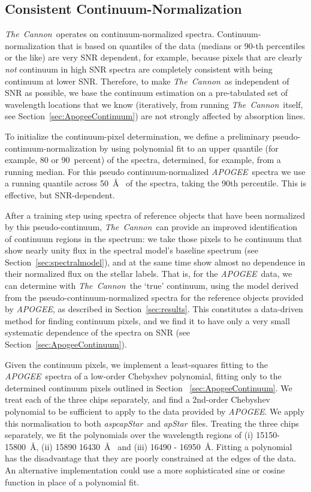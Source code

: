 \documentclass[12pt, preprint]{aastex}
\newcommand{\sectionname}{Section}
\newcommand{\tc}{\textsl{The~Cannon}}
\newcommand{\apogee}{\textsl{APOGEE}}
\newcommand{\aspcapstar}{\textsl{aspcapStar}}
\newcommand{\apstar}{\textsl{apStar}}
\begin{document}
\subsection{Consistent Continuum-Normalization}\label{sec:ContNorm}

\tc\ operates on continuum-normalized spectra.
Continuum-normalization that is based on quantiles of the data (medians or 90-th percentiles or the like)
are very SNR dependent, for example, because pixels that are clearly \emph{not} continuum in high SNR
spectra are completely consistent with being continuum at lower SNR.
Therefore, to make \tc\ as independent of SNR as possible,
we base the continuum estimation on a pre-tabulated set of wavelength locations that we know
(iteratively, from running \tc\ itself, see Section~\ref{sec:ApogeeContinuum}) are not strongly affected by absorption lines.

To initialize the continuum-pixel determination,
we define a preliminary pseudo-continuum-normalization by 
using polynomial fit to an upper quantile (for example, 80 or 90~percent) of the spectra, determined, for example, from a running median. For this pseudo continuum-normalized \apogee\ spectra we use a running quantile across 50~\AA~ of the spectra, taking the 90th percentile. This is effective, but SNR-dependent.
  
After a training step using spectra of reference objects that have been  normalized  by this pseudo-continuum,
 \tc\ can provide an improved identification of continuum regions in the spectrum: 
we take those pixels to be continuum that show nearly unity flux in the spectral model's baseline spectrum (see \sectionname~\ref{sec:spectralmodel}), and at the same time show almost no dependence in their normalized flux on the stellar labels.
That is, for the \apogee\ data, we can determine with \tc\ the `true' continuum, using the model derived from the pseudo-continuum-normalized spectra for the reference objects provided by \apogee, as described in \sectionname~\ref{sec:results}. This constitutes a data-driven method for finding continuum pixels, and we find it to have only a very small systematic dependence of the spectra on SNR (see \sectionname~\ref{sec:ApogeeContinuum}).

Given the continuum pixels, we implement a least-squares fitting to the \apogee\ spectra of a low-order Chebyshev polynomial, fitting only to the determined continuum pixels outlined in Section ~\ref{sec:ApogeeContinuum}. We treat each of the three chips separately, and find a 2nd-order Chebyshev polynomial to be sufficient to apply to the data provided by \apogee. We apply this normalisation to both \aspcapstar\ and \apstar\ files. Treating the three chips separately, we fit the polynomials over the wavelength regions of (i) 15150-15800~\AA, (ii) 15890 16430~\AA~ and (iii) 16490 - 16950~\AA. Fitting a polynomial has the disadvantage that they are poorly constrained at the edges of the data. An alternative implementation could use a more sophisticated sine or cosine function in place of a polynomial fit. 
\end{document}

